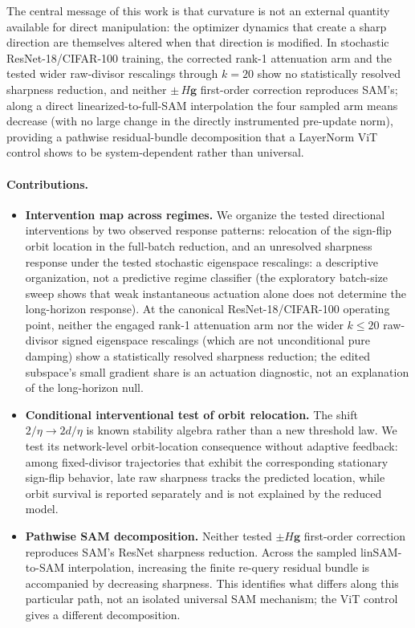 \documentclass{article}
\theoremstyle{plain}
\theoremstyle{definition}
\theoremstyle{remark}
\begin{document}
The central message of this work is that curvature is not an external
quantity available for direct manipulation: the optimizer dynamics
that create a sharp direction are themselves altered when that
direction is modified. In stochastic ResNet-18/CIFAR-100
training, the corrected rank-1 attenuation arm and the tested wider
raw-divisor rescalings through $k{=}20$ show no statistically
resolved sharpness reduction, and neither $\pm\,H\mathbf{g}$
first-order correction reproduces SAM's; along a direct
linearized-to-full-SAM interpolation the four sampled arm means
decrease (with no large change in the directly instrumented
pre-update norm), providing a pathwise residual-bundle decomposition
that a LayerNorm ViT control shows to be system-dependent rather than
universal.

\paragraph{Contributions.}
\begin{itemize}[leftmargin=*,itemsep=1pt]
\item \textbf{Intervention map across regimes.} We organize the
tested directional interventions by two observed response patterns:
relocation of the sign-flip orbit location in the full-batch
reduction, and an unresolved sharpness response under the tested
stochastic eigenspace rescalings: a descriptive organization, not a
predictive regime classifier (the exploratory batch-size sweep shows
that weak instantaneous actuation alone does not determine the
long-horizon response). At the canonical ResNet-18/CIFAR-100
operating point, neither the engaged rank-1 attenuation arm nor the
wider $k{\le}20$ raw-divisor signed eigenspace rescalings (which are
not unconditional pure damping) show a statistically resolved
sharpness reduction; the edited subspace's small gradient share is an
actuation diagnostic, not an explanation of the long-horizon
null.
\item \textbf{Conditional interventional test of orbit relocation.}
The shift $2/\eta \to 2d/\eta$ is known stability algebra rather than
a new threshold law. We test its network-level orbit-location
consequence without adaptive feedback: among fixed-divisor
trajectories that exhibit the corresponding stationary sign-flip
behavior, late raw sharpness tracks the predicted location, while
orbit survival is reported separately and is not explained by the
reduced model.
\item \textbf{Pathwise SAM decomposition.} Neither tested
$\pm H\mathbf{g}$ first-order correction reproduces SAM's ResNet
sharpness reduction. Across the sampled linSAM-to-SAM interpolation,
increasing the finite re-query residual bundle is accompanied by
decreasing sharpness. This identifies what differs along this
particular path, not an isolated universal SAM mechanism; the ViT
control gives a different decomposition.
\end{itemize}
\end{document}
